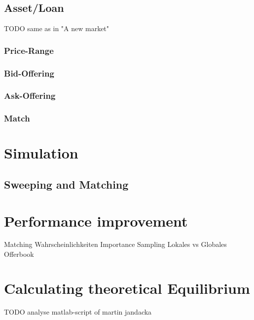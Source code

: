 \documentclass[Bachelorarbeit.tex]{subfiles}
\begin{document}
\subsection{Asset/Loan}
TODO same as in "A new market"
\subsubsection{Price-Range}
\subsubsection{Bid-Offering}
\subsubsection{Ask-Offering}
\subsubsection{Match}

\section{Simulation}
\subsection{Sweeping and Matching}
\label{sec:implementation_sweepingAndMatching}

\section{Performance improvement}
\label{sec:implementation_performanceImprovement}
Matching Wahrscheinlichkeiten
Importance Sampling
Lokales vs Globales Offerbook
		
\section{Calculating theoretical Equilibrium}
TODO analyse matlab-script of martin jandacka
\end{document}
